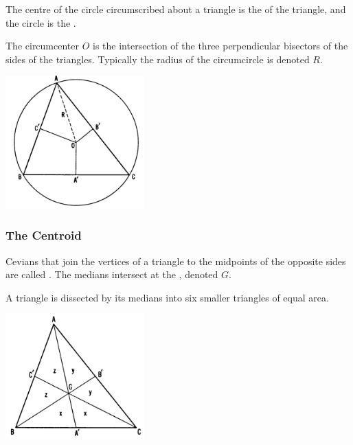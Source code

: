 \documentclass[DIV=12, a4]{scrartcl}
\begin{document}
\begin{definition}
	The centre of the circle circumscribed about a triangle is the  of the triangle, and the circle is the . 
\end{definition}
The circumcenter $O$ is the intersection of the three perpendicular bisectors of the sides of the triangles. Typically the radius of the circumcircle is denoted $R$.
\begin{center}
		\includegraphics[width=0.4\textwidth]{media/1-3A}
\end{center}

\subsubsection{The Centroid}

\begin{definition}
	Cevians that join the vertices of a triangle to the midpoints of the opposite sides are called . The medians intersect at the , denoted $G$.
\end{definition}

\begin{theorem}
	A triangle is dissected by its medians into six smaller triangles of equal area.
\end{theorem}

\begin{center}
		\includegraphics[width=0.4\textwidth]{media/1-3B}
\end{center}
\end{document}
